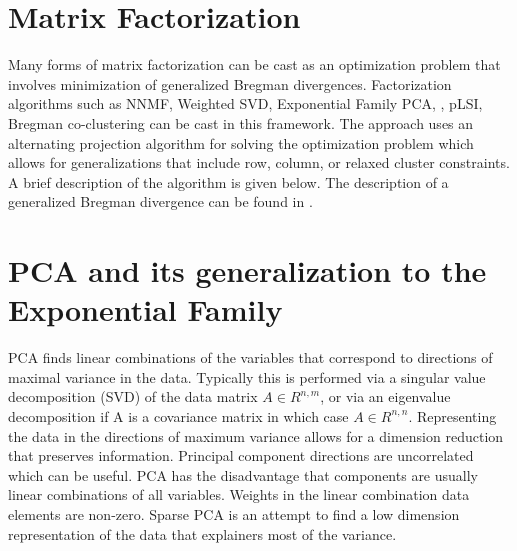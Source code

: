 \section{Matrix Factorization}
Many forms of matrix factorization can be cast as an optimization problem that involves minimization of generalized Bregman divergences\cite{BDAUnifiedViewMatrixFactorizationModels}.  Factorization algorithms such as  NNMF, Weighted SVD, Exponential Family PCA, , pLSI, Bregman co-clustering \cite{CCBanerjee04ageneralized} can be cast in this framework.  The approach uses an alternating projection algorithm for solving the optimization problem which allows for generalizations that include row, column, or relaxed cluster  constraints.  A brief description of the algorithm is given below.  The description of a generalized Bregman divergence can be found in \cite{BDGordon99approximatesolutions}.



\section{PCA and its generalization to the Exponential Family}
PCA finds linear combinations of the variables that correspond to directions of maximal variance in the data. Typically this is performed via a singular value decomposition (SVD) of the data matrix $A \in R^{n,m}$, or via an eigenvalue decomposition if A is a covariance matrix in which case $A \in R^{n,n}$. Representing the data in the directions of maximum variance allows for a dimension reduction that preserves information. Principal component directions are uncorrelated which can be useful.  PCA has the disadvantage that components are usually linear combinations of all variables. Weights in the linear combination data elements are non-zero. Sparse PCA is an attempt to find a low dimension representation of the data that explainers most of the variance.

